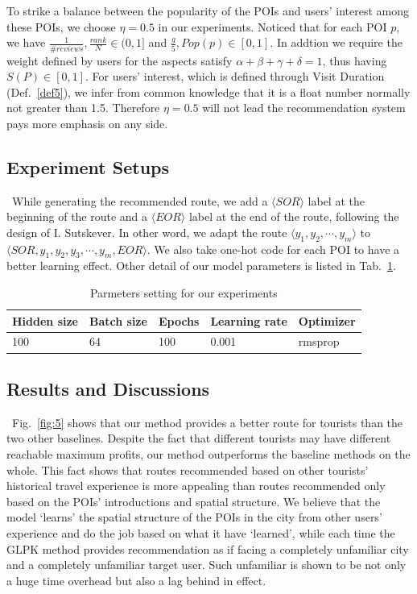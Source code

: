 \documentclass[runningheads]{llncs}
\begin{document}
To strike a balance between the popularity of the POIs and users' interest among these POIs, we choose $\eta=0.5$ in our experiments. Noticed that for each POI $p$, we have $\frac{1}{\#reviews},\frac{rank}{N}\in(0,1]$ and $\frac{g}{5},Pop(p)\in[0,1]$. In addtion we require the weight defined by users for the aspects satisfy $\alpha+\beta+\gamma+\delta=1$, thus having $S(P)\in[0,1]$. For users' interest, which is defined through Visit Duration (Def.~\ref{def5}), we infer from common knowledge that it is a float number normally not greater than 1.5. Therefore $\eta=0.5$ will not lead the recommendation system pays more emphasis on any side. 
\subsection{Experiment Setups}
\quad\, While generating the recommended route, we add a $\langle SOR\rangle$ label at the beginning of the route and a $\langle EOR\rangle$ label at the end of the route, following the design of I. Sutskever\cite{DBLP:conf/nips/SutskeverVL14}. In other word, we adapt the route $\langle y_1,y_2,\cdots,y_m\rangle$ to $\langle SOR,y_1,y_2,y_3,\cdots,y_m,EOR\rangle$. We also take one-hot code for each POI to have a better learning effect. Other detail of our model parameters is listed in Tab.~\ref{tab:2}.
\begin{table}
	\caption{Parmeters setting for our experiments}
	\centering
	\begin{tabular}{|l|l|l|l|l|}
		\hline
		Hidden size & Batch size & Epochs & Learning rate & Optimizer\\
		\hline
		100 & 64 & 100 & 0.001 & rmsprop\\
		\hline
	\end{tabular}
    \label{tab:2}
\end{table}
\subsection{Results and Discussions}
\quad\, Fig.~\ref{fig:5} shows that our method provides a better route for tourists than the two other baselines. Despite the fact that different tourists may have different reachable maximum profits, our method outperforms the baseline methods on the whole. This fact shows that routes recommended based on other tourists' historical travel experience is more appealing than routes recommended only based on the POIs' introductions and spatial structure. We believe that the model `learns' the spatial structure of the POIs in the city from other users' experience and do the job based on what it have `learned', while each time the GLPK method provides recommendation as if facing a completely unfamiliar city and a completely unfamiliar target user. Such unfamiliar is shown to be not only a huge time overhead but also a lag behind in effect. 
\end{document}
